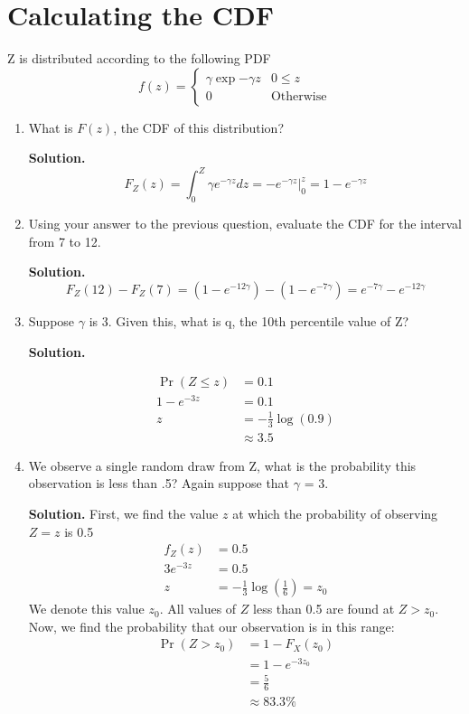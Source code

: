 \documentclass[12pt]{article}
\begin{document}
\section{Calculating the CDF}
Z is distributed according to the following PDF
\[f(z) = \begin{cases}
    \gamma \exp{-\gamma z} & 0 \leq z
    \\ 0 & \text{Otherwise}
\end{cases}\]

\begin{enumerate}
    \item  What is $F(z)$, the CDF of this distribution?
    
    \textbf{Solution.}
    \[ F_Z(z) = \int_0^Z \gamma e^{-\gamma z} dz = -e^{- \gamma z} \bigg|_0^z = 1-e^{- \gamma z}\]

    \item  Using your answer to the previous question, evaluate the CDF for the interval from 7 to 12.

    \textbf{Solution.}
    \[ F_Z(12)-F_Z(7) = \left( 1- e^{-12\gamma}\right) - \left( 1- e^{-7\gamma}\right) =  e^{-7\gamma}- e^{-12\gamma}\]

    \item  Suppose $\gamma$ is 3. Given this, what is q, the 10th percentile value of Z?

    \textbf{Solution.}

    \begin{align*}
        \Pr(Z \leq z) &= 0.1
        \\ 1-e^{- 3 z} &= 0.1
        \\ z &= -\frac{1}{3}\log(0.9)
        \\ &\approx 3.5
    \end{align*}

    \item  We observe a single random draw from Z, what is the probability this observation is less than .5? Again suppose that $\gamma$ = 3.

    \textbf{Solution.}
    First, we find the value $z$ at which the probability of observing $Z=z$ is 0.5
    \begin{align*}
        f_Z(z) &= 0.5
        \\ 3e^{-3z} &= 0.5
        \\ z &= - \frac{1}{3}\log(\frac{1}{6})=z_0
    \end{align*}    
    We denote this value $z_0$. All values of $Z$ less than 0.5 are found at $Z > z_0$. Now, we find the probability that our observation is in this range:
    \begin{align*}
        \Pr(Z > z_0) &= 1-F_X(z_0)
        \\ &= 1-e^{-3z_0}
        \\ &= \frac{5}{6}
        \\ &\approx 83.3\%
        \end{align*}
\end{enumerate}
\end{document}
